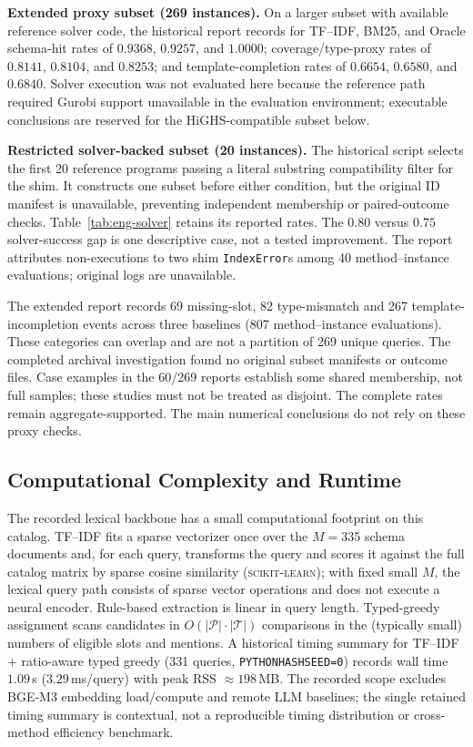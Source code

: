 \medskip\noindent\textbf{Extended proxy subset (269 instances).}
On a larger subset with available reference solver code, the historical report records for TF--IDF, BM25, and Oracle schema-hit rates of $0.9368$, $0.9257$, and $1.0000$; coverage/type-proxy rates of $0.8141$, $0.8104$, and $0.8253$; and template-completion rates of $0.6654$, $0.6580$, and $0.6840$. Solver execution was not evaluated here because the reference path required Gurobi support unavailable in the evaluation environment; executable conclusions are reserved for the HiGHS-compatible subset below.

\medskip\noindent\textbf{Restricted solver-backed subset (20 instances).}
The historical script selects the first 20 reference programs passing a literal substring compatibility filter for the shim. It constructs one subset before either condition, but the original ID manifest is unavailable, preventing independent membership or paired-outcome checks. Table~\ref{tab:eng-solver} retains its reported rates. The $0.80$ versus $0.75$ solver-success gap is one descriptive case, not a tested improvement. The report attributes non-executions to two shim \texttt{IndexError}s among 40 method--instance evaluations; original logs are unavailable.



The extended report records 69 missing-slot, 82 type-mismatch and 267 template-incompletion events across three baselines (807 method--instance evaluations). These categories can overlap and are not a partition of 269 unique queries. The completed archival investigation found no original subset manifests or outcome files. Case examples in the 60/269 reports establish some shared membership, not full samples; these studies must not be treated as disjoint. The complete rates remain aggregate-supported. The main numerical conclusions do not rely on these proxy checks.


\subsection{Computational Complexity and Runtime}
\label{app:runtime-details}\label{subsec:exp_runtime}

The recorded lexical backbone has a small computational footprint on this catalog. TF--IDF fits a sparse vectorizer once over the $M=335$ schema documents and, for each query, transforms the query and scores it against the full catalog matrix by sparse cosine similarity (\textsc{scikit-learn}); with fixed small $M$, the lexical query path consists of sparse vector operations and does not execute a neural encoder. Rule-based extraction is linear in query length. Typed-greedy assignment scans candidates in $O(|\mathcal{P}|\cdot|\mathcal{T}|)$ comparisons in the (typically small) numbers of eligible slots and mentions. A historical timing summary for TF--IDF + ratio-aware typed greedy (331 queries, \texttt{PYTHONHASHSEED=0}) records wall time $1.09$\,s ($3.29$\,ms/query) with peak RSS $\approx 198$\,MB. The recorded scope excludes BGE-M3 embedding load/compute and remote LLM baselines; the single retained timing summary is contextual, not a reproducible timing distribution or cross-method efficiency benchmark.


